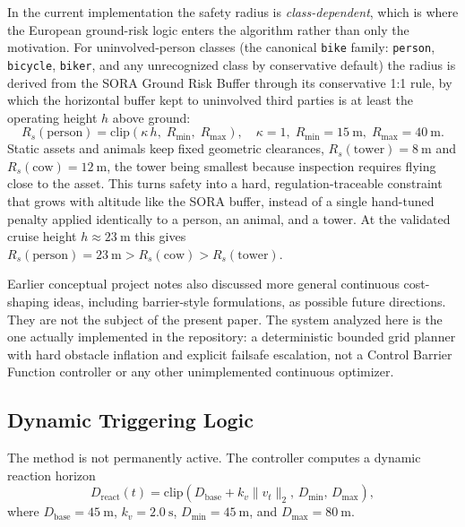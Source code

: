\documentclass[journal,twoside,web]{ieeecolor}
\begin{document}
In the current implementation the safety radius is \emph{class-dependent}, which is where the European ground-risk logic enters the algorithm rather than only the motivation. For uninvolved-person classes (the canonical \texttt{bike} family: \texttt{person}, \texttt{bicycle}, \texttt{biker}, and any unrecognized class by conservative default) the radius is derived from the SORA Ground Risk Buffer through its conservative 1:1 rule, by which the horizontal buffer kept to uninvolved third parties is at least the operating height \(h\) above ground:
\begin{equation}
R_s(\mathrm{person}) = \mathrm{clip}\!\left(\kappa\,h,\; R_{\min},\; R_{\max}\right),\quad \kappa=1,\; R_{\min}=\SI{15}{\meter},\; R_{\max}=\SI{40}{\meter}.
\end{equation}
Static assets and animals keep fixed geometric clearances, \(R_s(\mathrm{tower})=\SI{8}{\meter}\) and \(R_s(\mathrm{cow})=\SI{12}{\meter}\), the tower being smallest because inspection requires flying close to the asset. This turns safety into a hard, regulation-traceable constraint that grows with altitude like the SORA buffer, instead of a single hand-tuned penalty applied identically to a person, an animal, and a tower. At the validated cruise height \(h\approx\SI{23}{\meter}\) this gives \(R_s(\mathrm{person})=\SI{23}{\meter}>R_s(\mathrm{cow})>R_s(\mathrm{tower})\).

Earlier conceptual project notes also discussed more general continuous cost-shaping ideas, including barrier-style formulations, as possible future directions. They are not the subject of the present paper. The system analyzed here is the one actually implemented in the repository: a deterministic bounded grid planner with hard obstacle inflation and explicit failsafe escalation, not a Control Barrier Function controller or any other unimplemented continuous optimizer.

\subsection{Dynamic Triggering Logic}

The method is not permanently active. The controller computes a dynamic reaction horizon
\begin{equation}
    D_{\mathrm{react}}(t) =
    \mathrm{clip}\!\left(D_{\mathrm{base}} + k_v \lVert v_t \rVert_2,\,
    D_{\min},\, D_{\max}\right),
\end{equation}
where \(D_{\mathrm{base}}=\SI{45}{\meter}\), \(k_v=\SI{2.0}{\second}\), \(D_{\min}=\SI{45}{\meter}\), and \(D_{\max}=\SI{80}{\meter}\).
\end{document}
